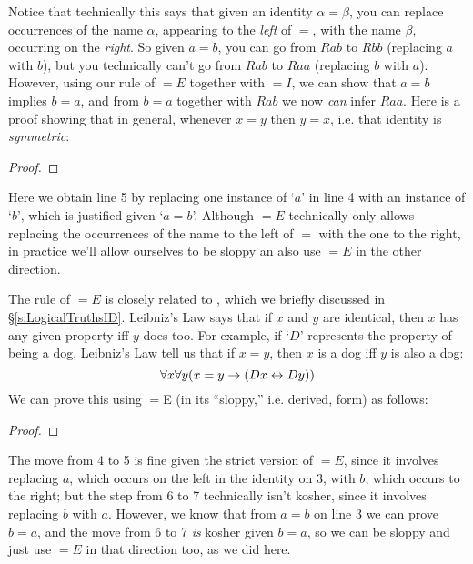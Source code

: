 Notice that technically this says that given an identity $\alpha = \beta$, you can replace occurrences of the name $\alpha$, appearing to the \emph{left} of $=$, with the name $\beta$, occurring on the \emph{right}.  So given $a=b$, you can go from $Rab$ to $Rbb$ (replacing $a$ with $b$), but you technically can't go from $Rab$ to $Raa$ (replacing $b$ with $a$).  However, using our rule of $=E$ together with $=I$, we can  show that $a=b$ implies $b=a$, and from $b=a$ together with $Rab$ we now \emph{can} infer $Raa$.  Here is a proof showing that in general, whenever $x=y$ then $y=x$, i.e. that identity is \emph{symmetric}:

\begin{proof}
\open
	 \fl{}
	\open
		 \fl{}
		\open
			  
			 
			 
		\close
		 
	\close
	 
\close
{} 


\end{proof}
Here we obtain line 5 by replacing one instance of `$a$' in line 4 with an instance of `$b$', which is justified given `$a= b$'.  Although $=E$ technically only allows replacing the occurrences of the name to the left of $=$ with the one to the right, in practice we'll allow ourselves to be sloppy an also use $=E$ in the other direction.



The rule of $=E$ is closely related to , which we briefly discussed in \S\ref{s:LogicalTruthsID}. Leibniz's Law says that if $x$ and $y$ are identical, then $x$ has any given property  iff $y$ does too. For example, if `$D$' represents the property of being a dog, Leibniz's Law tell us that if $x=y$, then $x$ is a dog iff $y$ is also a dog:
$$\forall x \forall y (x = y \rightarrow (Dx \leftrightarrow Dy))$$
We can prove this using $=$E (in its ``sloppy,'' i.e. derived, form) as follows:

\begin{proof}
\open
	 \fl{}
	\open
		 \fl{}
		\open
			 
			\open
				 
			\close
			\open
				 
				 
			\close
		 
		\close
	 
	\close
	 
	\close
	 

\end{proof}
The move from 4 to 5 is fine given the strict version of $=E$, since it involves replacing $a$, which occurs on the left in the identity on 3, with $b$, which occurs to the right; but the step from 6 to 7 technically isn't kosher, since it involves replacing $b$ with $a$.  However, we know that from $a=b$ on line 3 we can prove $b=a$, and the move from 6 to 7 \emph{is} kosher given $b=a$, so we can be sloppy and just use $=E$ in that direction too, as we did here.



